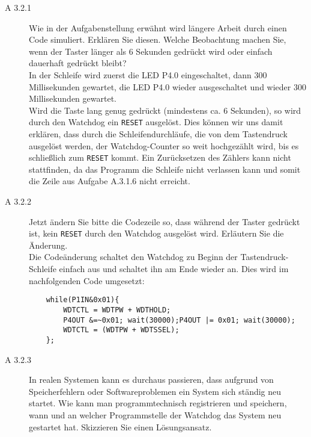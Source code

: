 \documentclass[11pt,a4paper,ngerman]{article}
\begin{document}
\begin{description}
	\item[A 3.2.1] Wie in der Aufgabenstellung erwähnt wird längere Arbeit durch einen Code simuliert. Erklären Sie diesen. Welche Beobachtung machen Sie, wenn der Taster länger als 6 Sekunden gedrückt wird oder einfach dauerhaft gedrückt bleibt? \\

	In der Schleife wird zuerst die LED P4.0 eingeschaltet, dann 300 Millisekunden gewartet, die LED P4.0 wieder ausgeschaltet und wieder 300 Millisekunden gewartet.\\
	Wird die Taste lang genug gedrückt (mindestens ca. 6 Sekunden), so wird durch den Watchdog ein \texttt{RESET} ausgelöst. Dies können wir uns damit erklären, dass durch die Schleifendurchläufe, die von dem Tastendruck ausgelöst werden, der Watchdog-Counter so weit hochgezählt wird, bis es schließlich zum \texttt{RESET} kommt. Ein Zurücksetzen des Zählers kann nicht stattfinden, da das Programm die Schleife nicht verlassen kann und somit die Zeile aus Aufgabe A.3.1.6 nicht erreicht.

	\item[A 3.2.2] Jetzt ändern Sie bitte die Codezeile so, dass während der Taster gedrückt ist, kein \texttt{RESET} durch den Watchdog ausgelöst wird. Erläutern Sie die Änderung. \\
	
	Die Codeänderung schaltet den Watchdog zu Beginn der Tastendruck-Schleife einfach aus und schaltet ihn am Ende wieder an. Dies wird im nachfolgenden Code umgesetzt:
	\begin{lstlisting}
	while(P1IN&0x01){
		WDTCTL = WDTPW + WDTHOLD;
		P4OUT &=~0x01; wait(30000);P4OUT |= 0x01; wait(30000);
		WDTCTL = (WDTPW + WDTSSEL);
	};
	\end{lstlisting}
	
	\item[A 3.2.3] In realen Systemen kann es durchaus passieren, dass aufgrund von Speicherfehlern oder Softwareproblemen ein System sich ständig neu startet. Wie kann man programmtechnisch registrieren und speichern, wann und an welcher Programmstelle der Watchdog das System neu gestartet hat. Skizzieren Sie einen Lösungsansatz. \\



\end{description}
\end{document}
